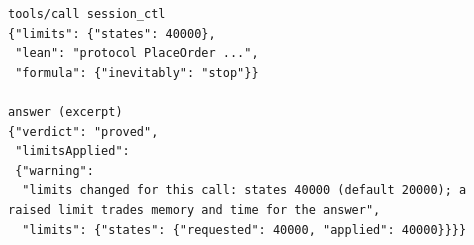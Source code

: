 \begin{lstlisting}[language={},basicstyle=\ttfamily\footnotesize,breaklines=true]
tools/call session_ctl
{"limits": {"states": 40000},
 "lean": "protocol PlaceOrder ...",
 "formula": {"inevitably": "stop"}}

answer (excerpt)
{"verdict": "proved",
 "limitsApplied":
 {"warning":
  "limits changed for this call: states 40000 (default 20000); a raised limit trades memory and time for the answer",
  "limits": {"states": {"requested": 40000, "applied": 40000}}}}
\end{lstlisting}
